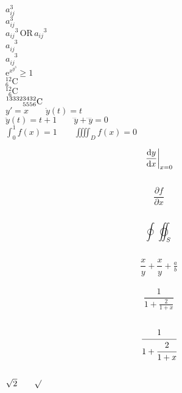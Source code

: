 \documentclass[]{article}
\begin{document}
	
	
	$a^3_{ij}$ \\
	
	$a_{ij}^3$ \\
	
	${a_{ij}}^3 \, \text{OR} \, a_{ij}{}^3$ \\
	
	$a^{\phantom{ij}3}_{ij}$ \\
	
	$a^{\phantom{ij}3}_{ij}$ \\
	
	$\mathrm{e}^{x^{y^3}} \geq 1 $ \\
	
	$ {}_{6}^{12}\mathrm{C} $ \\
	
	$ {}_{\phantom{1}6}^{12}\mathrm{C} $ \\ %
	
	$\prescript{133323432}{5556}{\mathrm{C}}$ \\
	
	
	$y'=x \qquad \dot{y}(t)=t $ \\
	
	$\ddot{y}(t) = t + 1 \qquad \dddot{y} + \ddddot{y} = 0 $ \\
	
	$\int_{0}^{1}f(x) = 1 \qquad \iiiint_D f(x) = 0 $ \\
	
	\newcommand{\ud}{\mathop{}\negthinspace\mathrm{d}}
	
	\[
		\left.\frac{\ud y}{\ud x} \right |_{x=0}
	\] \\
	
	\[
		\frac{ \partial f } { \partial x}
	\] \\
	
	\[
		\oint \; \varoiint_S
	\] \\ %
	
	
	\[ \frac{x}{y} + \dfrac{x}{y} + \tfrac{a}{b} \]	\\
	
	\[ \frac{1}{1+\frac{2}{1+x}} \] \\
	
	\[ \cfrac{1}{1+\cfrac{2}{1+x}} \] \\
	
	$ \sqrt{2} \qquad \surd $ \\
	
\end{document}
